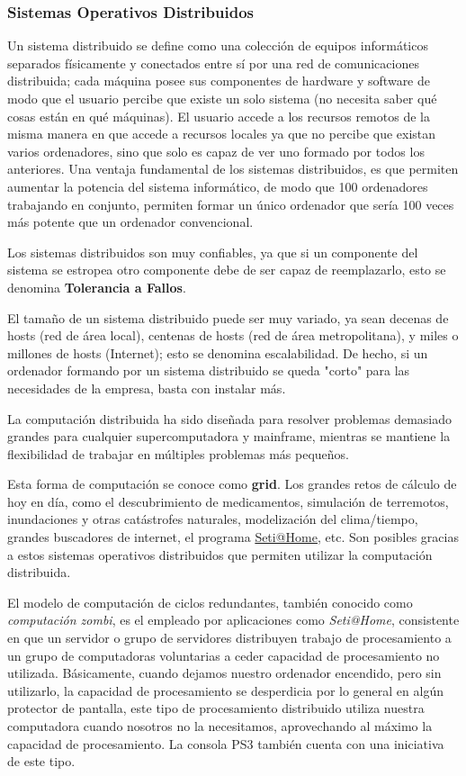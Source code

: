 \documentclass[11pt]{article}
\begin{document}
\subsubsection{Sistemas Operativos Distribuidos}
\label{sec:org8e3e12a}
Un sistema distribuido se define como una colección de equipos
informáticos separados físicamente y conectados entre sí por una red de
comunicaciones distribuida; cada máquina posee sus componentes de
hardware y software de modo que el usuario percibe que existe un solo
sistema (no necesita saber qué cosas están en qué máquinas). El usuario
accede a los recursos remotos de la misma manera en que accede a
recursos locales ya que no percibe que existan varios ordenadores, sino
que solo es capaz de ver uno formado por todos los anteriores. Una
ventaja fundamental de los sistemas distribuidos, es que permiten
aumentar la potencia del sistema informático, de modo que 100
ordenadores trabajando en conjunto, permiten formar un único ordenador
que sería 100 veces más potente que un ordenador convencional.

Los sistemas distribuidos son muy confiables, ya que si un componente
del sistema se estropea otro componente debe de ser capaz de
reemplazarlo, esto se denomina \textbf{Tolerancia a Fallos}.

El tamaño de un sistema distribuido puede ser muy variado, ya sean
decenas de hosts (red de área local), centenas de hosts (red de área
metropolitana), y miles o millones de hosts (Internet); esto se denomina
escalabilidad. De hecho, si un ordenador formando por un sistema
distribuido se queda "corto" para las necesidades de la empresa, basta
con instalar más.

La computación distribuida ha sido diseñada para resolver problemas
demasiado grandes para cualquier supercomputadora y mainframe, mientras
se mantiene la flexibilidad de trabajar en múltiples problemas más
pequeños.

Esta forma de computación se conoce como \textbf{grid}. Los grandes retos de
cálculo de hoy en día, como el descubrimiento de medicamentos,
simulación de terremotos, inundaciones y otras catástrofes naturales,
modelización del clima/tiempo, grandes buscadores de internet, el
programa \href{http://setiweb.ssl.berkeley.edu/}{Seti@Home}, etc. Son
posibles gracias a estos sistemas operativos distribuidos que permiten
utilizar la computación distribuida.

El modelo de computación de ciclos redundantes, también conocido como
\emph{computación zombi}, es el empleado por aplicaciones como \emph{Seti@Home},
consistente en que un servidor o grupo de servidores distribuyen trabajo
de procesamiento a un grupo de computadoras voluntarias a ceder
capacidad de procesamiento no utilizada. Básicamente, cuando dejamos
nuestro ordenador encendido, pero sin utilizarlo, la capacidad de
procesamiento se desperdicia por lo general en algún protector de
pantalla, este tipo de procesamiento distribuido utiliza nuestra
computadora cuando nosotros no la necesitamos, aprovechando al máximo la
capacidad de procesamiento. La consola PS3 también cuenta con una
iniciativa de este tipo.
\end{document}
